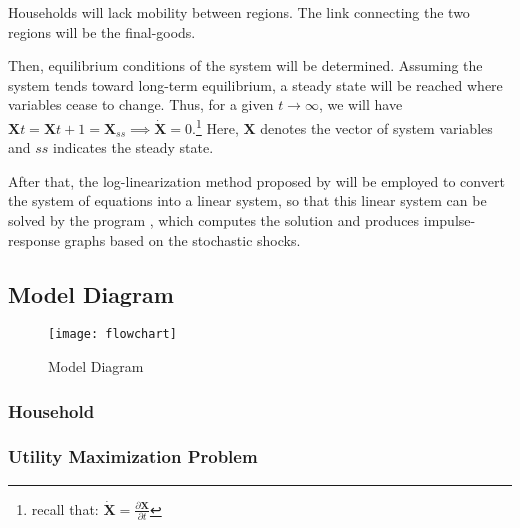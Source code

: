 \documentclass[
thesis.tex
]{subfiles}
\begin{document}
	Households will lack mobility between regions. The link connecting the two regions will be the final-goods.
	
	Then, equilibrium conditions of the system will be determined. Assuming the system tends toward long-term equilibrium, a steady state will be reached where variables cease to change. Thus, for a given $t \longrightarrow \infty$, we will have $\boldsymbol{X}t = \boldsymbol{X}{t+1} = \boldsymbol{X}_{ss} \implies \boldsymbol{\dot{X}} = 0$.\footnote{recall that: $\boldsymbol{\dot{X}} = \frac{\partial \boldsymbol{X}}{\partial t}$} Here, $\boldsymbol{X}$ denotes the vector of system variables and $ss$ indicates the steady state.
	
	After that, the log-linearization method proposed by \textcite{uhlig_toolkit_1999} will be employed to convert the system of equations into a linear system, so that this linear system can be solved by the program \dynare{}, which computes the solution and produces impulse-response graphs based on the stochastic shocks.
	
	
	
	\subsection*{Model Diagram}
	
	\begin{figure}[h!]
		\centering
		\texttt{[image: flowchart]}
		\caption{Model Diagram}
		\label{fig:model-diagram}
	\end{figure}
	
	\newpage
	
	
	\subsubsection{Household}
	
	\subsubsection*{Utility Maximization Problem}
	
\end{document}
